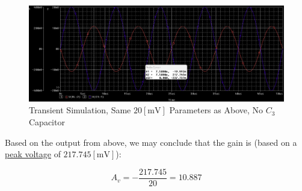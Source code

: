 \begin{enumerate}
\begin{enumerate}
        \begin{figure}[H]
          \centering
          \includegraphics[width=.9\textwidth]{Figures/HW7-3e2}
          \caption{Transient Simulation, Same $20[\si{\milli\volt}]$ Parameters as Above, No $C_3$ Capacitor}
          \label{fig:13}
        \end{figure}

        Based on the output from above, we may conclude that the gain is (based on a \underline{peak voltage} of $217.745[\si{\milli\volt}]$):

        $$\boxed{A_v=-\frac{217.745}{20}=10.887}$$

    \end{enumerate}

\end{enumerate}



